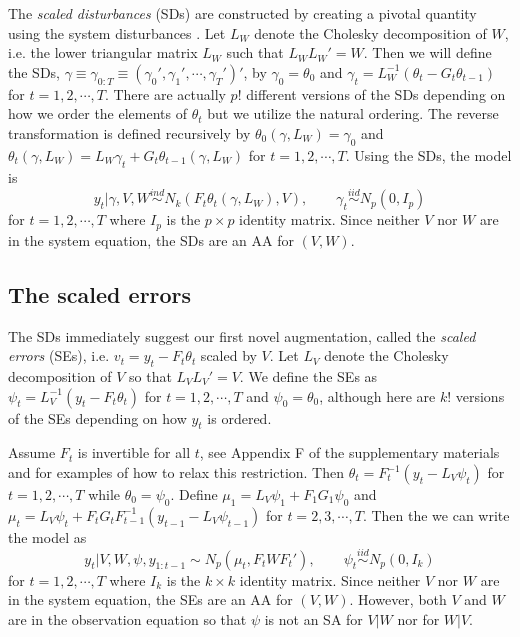 \documentclass[12pt]{article}
\begin{document}
The {\it scaled disturbances} (SDs) are constructed by creating a pivotal quantity using the system disturbances \citep{fruhwirth2004efficient}. Let $L_W$ denote the Cholesky decomposition of $W$, i.e. the lower triangular matrix $L_W$ such that $L_WL_W' =W$. Then we will define the SDs, $\gamma\equiv\gamma_{0:T}\equiv(\gamma_0',\gamma_1',\cdots,\gamma_T')'$, by $\gamma_0=\theta_0$ and $\gamma_t = L_W^{-1}(\theta_t-G_t\theta_{t-1})$ for $t=1,2,\cdots,T$. There are actually $p!$ different versions of the SDs depending on how we order the elements of $\theta_t$ but we utilize the natural ordering. 
The reverse transformation is defined recursively by $\theta_0(\gamma,L_W)=\gamma_0$ and $\theta_t(\gamma,L_W)=L_W\gamma_t + G_t\theta_{t-1}(\gamma,L_W)$ for $t=1,2,\cdots,T$. 
Using the SDs, the model is \vspace{-.3cm}
\[ y_t|\gamma,V,W  \stackrel{ind}{\sim} N_k\left(F_t\theta_t(\gamma,L_W), V\right), \qquad \gamma_t  \stackrel{iid}{\sim}N_p(0,I_p) \label{dlmdistmodel}
\]
for $t=1,2,\cdots,T$ where $I_p$ is the $p\times p$ identity matrix. Since neither $V$ nor $W$ are in the system equation, the SDs are an AA for $(V,W)$. 

\subsection{The scaled errors}\label{sec:DAs:error}
The SDs immediately suggest our first novel augmentation, called the {\it scaled errors} (SEs), i.e. $v_t=y_t - F_t\theta_t$ scaled by $V$. Let $L_V$ denote the Cholesky decomposition of $V$ so that $L_VL_V'=V$. We define the SEs as $\psi_t = L_V^{-1}(y_t - F_t\theta_t)$ for $t=1,2,\cdots,T$ and $\psi_0 = \theta_0$, although here are $k!$ versions of the SEs depending on how $y_t$ is ordered.

Assume $F_t$ is invertible for all $t$, see Appendix F of the supplementary materials and \blind \citet{simpson2014app} \fi for examples of how to relax this restriction. Then $\theta_t = F_t^{-1}(y_t - L_V\psi_t)$ for $t=1,2,\cdots,T$ while $\theta_0=\psi_0$. Define $\mu_1 = L_V\psi_1 + F_1G_1\psi_0$ and $\mu_t =L_V\psi_t + F_tG_tF_{t-1}^{-1}(y_{t-1} - L_{V}\psi_{t-1})$ for $t=2,3,\cdots,T$. Then the we can write the model as \vspace{-.3cm}
\[
  y_t|V,W,\psi,y_{1:t-1} \sim N_p(\mu_t, F_tWF_t'), \qquad \psi_t  \stackrel{iid}{\sim} N_p(0,I_k)
\]
for $t=1,2,\cdots,T$ where $I_k$ is the $k\times k$ identity matrix. Since neither $V$ nor $W$ are in the system equation, the SEs are an AA for $(V,W)$. However, both $V$ and $W$ are in the observation equation so that $\psi$ is not an SA for $V|W$ nor for $W|V$.
\end{document}
